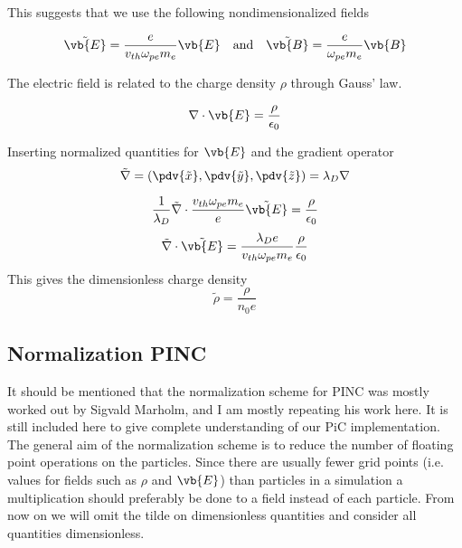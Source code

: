         This suggests that we use the following nondimensionalized fields

        \begin{equation}
            \tilde{\vb{E}} = \frac{e}{v_{th}\omega_{pe}m_e}\vb{E} \quad{\text{and}} \quad \tilde{\vb{B}} = \frac{e}{\omega_{pe}m_e}\vb{B}
        \end{equation}

        The electric field is related to the charge density \(\rho\) through Gauss'
        law.

        \begin{equation}
            \nabla \cdot \vb{E} = \frac{\rho}{\epsilon_0}
        \end{equation}

        Inserting normalized quantities for \(\vb{E}\) and the gradient operator
        \[\tilde{\nabla}=\left(\pdv{\tilde x}, \pdv{\tilde y} , \pdv{\tilde z}\right) = \lambda_D \nabla\]

        \begin{equation}
            \frac{1}{\lambda_D}\tilde\nabla \cdot \frac{v_{th}\omega_{pe}m_e}{e}\tilde{\vb{E}} = \frac{\rho}{\epsilon_0}
        \end{equation}
        \begin{equation}
            \tilde\nabla \cdot\tilde{\vb{E}} = \frac{\lambda_De}{v_{th}\omega_{pe}m_e}\frac{\rho}{\epsilon_0}
        \end{equation}
        This gives the dimensionless charge density
        \begin{equation}
            \tilde \rho = \frac{\rho}{n_0e}
        \end{equation}

    \subsection{Normalization PINC}
        It should be mentioned that the normalization scheme for PINC was mostly worked
        out by Sigvald Marholm, and I am mostly repeating his work here. It is still
        included here to give complete understanding of our PiC implementation.
        The general aim of the normalization scheme is to reduce the number of
        floating point operations on the particles. Since there are usually
        fewer grid points (i.e. values for fields such as \(\rho\) and \(\vb{E}\))
        than particles in a simulation a multiplication should preferably be done to
        a field instead of each particle. From now on we will omit the tilde on dimensionless
        quantities and consider all quantities dimensionless.

